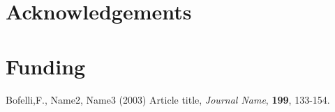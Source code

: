 \documentclass{bioinfo}
\begin{document}
\section*{Acknowledgements}

\section*{Funding}

%
%
%
%
%
%
%
%
%


\begin{thebibliography}{}

Bofelli,F., Name2, Name3 (2003) Article title, {\it Journal Name}, {\bf 199}, 133-154.


\end{thebibliography}
\end{document}

